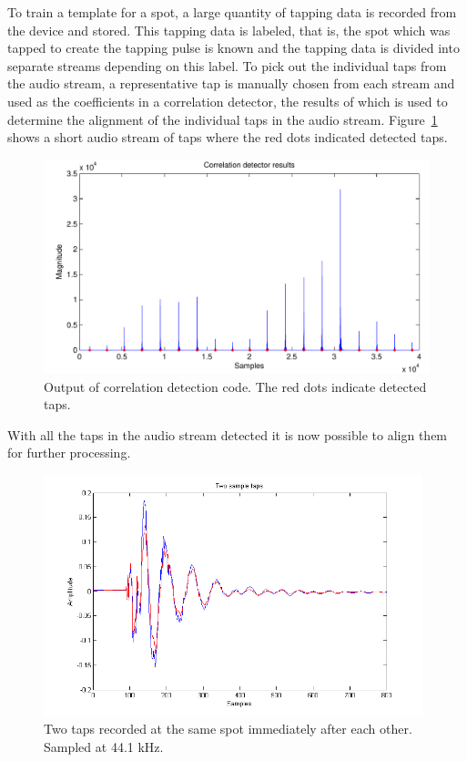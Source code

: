 To train a template for a spot, a large quantity of tapping data is recorded from the device and stored. This tapping data is labeled, that is, the spot which was tapped to create the tapping pulse is known and the tapping data is divided into separate streams depending on this label. To pick out the individual taps from the audio stream, a representative tap is manually chosen from each stream and used as the coefficients in a correlation detector, the results of which is used to determine the alignment of the individual taps in the audio stream. Figure~\ref{fig:correlationDetect} shows a short audio stream of taps where the red dots indicated detected taps.

\begin{figure}[!]
\centering
\includegraphics[width=150mm]{correlationDetect.pdf}
\caption{Output of correlation detection code. The red dots indicate detected taps.}\label{fig:correlationDetect}
\end{figure}

With all the taps in the audio stream detected it is now possible to align them for further processing.

\begin{figure}[!]
\centering
\includegraphics[width=110mm]{twoSampleTaps.png}
\caption{Two taps recorded at the same spot immediately after each other. Sampled at 44.1 kHz.}\label{fig:twoSampleTaps}
\end{figure}

